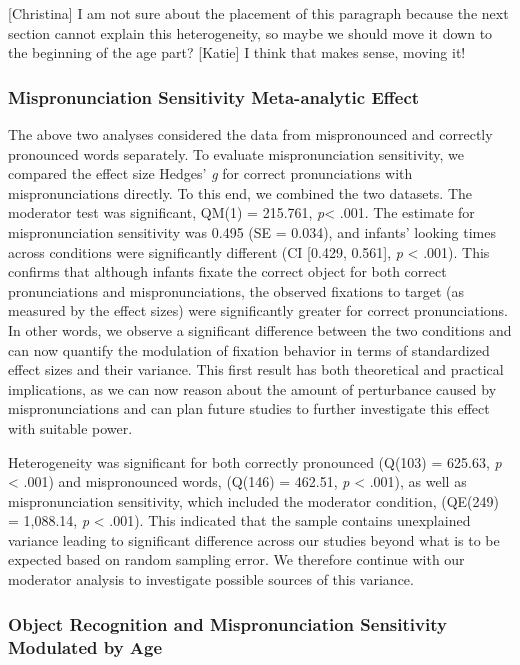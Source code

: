 \documentclass[man]{apa6}
\theoremstyle{definition}
\theoremstyle{definition}
\theoremstyle{definition}
\theoremstyle{remark}
\begin{document}
{[}Christina{]} I am not sure about the placement of this paragraph
because the next section cannot explain this heterogeneity, so maybe we
should move it down to the beginning of the age part? {[}Katie{]} I
think that makes sense, moving it!

\subsubsection{Mispronunciation Sensitivity Meta-analytic
Effect}\label{mispronunciation-sensitivity-meta-analytic-effect}

The above two analyses considered the data from mispronounced and
correctly pronounced words separately. To evaluate mispronunciation
sensitivity, we compared the effect size Hedges' \emph{g} for correct
pronunciations with mispronunciations directly. To this end, we combined
the two datasets. The moderator test was significant, QM(1) = 215.761,
\emph{p}\textless{} .001. The estimate for mispronunciation sensitivity
was 0.495 (SE = 0.034), and infants' looking times across conditions
were significantly different (CI {[}0.429, 0.561{]}, \emph{p}
\textless{} .001). This confirms that although infants fixate the
correct object for both correct pronunciations and mispronunciations,
the observed fixations to target (as measured by the effect sizes) were
significantly greater for correct pronunciations. In other words, we
observe a significant difference between the two conditions and can now
quantify the modulation of fixation behavior in terms of standardized
effect sizes and their variance. This first result has both theoretical
and practical implications, as we can now reason about the amount of
perturbance caused by mispronunciations and can plan future studies to
further investigate this effect with suitable power.

Heterogeneity was significant for both correctly pronounced (Q(103) =
625.63, \emph{p} \textless{} .001) and mispronounced words, (Q(146) =
462.51, \emph{p} \textless{} .001), as well as mispronunciation
sensitivity, which included the moderator condition, (QE(249) =
1,088.14, \emph{p} \textless{} .001). This indicated that the sample
contains unexplained variance leading to significant difference across
our studies beyond what is to be expected based on random sampling
error. We therefore continue with our moderator analysis to investigate
possible sources of this variance.

\subsubsection{Object Recognition and Mispronunciation Sensitivity
Modulated by
Age}\label{object-recognition-and-mispronunciation-sensitivity-modulated-by-age}
\end{document}
